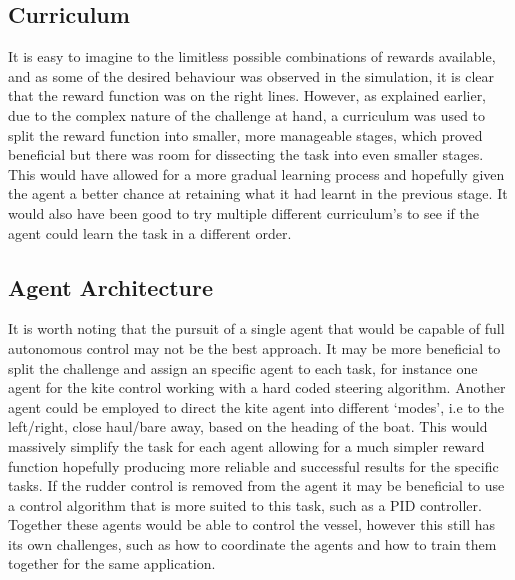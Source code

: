 \subsection*{Curriculum}

It is easy to imagine to the limitless possible combinations of rewards available, and as some of the desired behaviour was observed in the simulation, it is clear that the reward function was on the right lines. However, as explained earlier, due to the complex nature of the challenge at hand, a curriculum was used to split the reward function into smaller, more manageable stages, which proved beneficial but there was room for dissecting the task into even smaller stages. This would have allowed for a more gradual learning process and hopefully given the agent a better chance at retaining what it had learnt in the previous stage. It would also have been good to try multiple different curriculum's to see if the agent could learn the task in a different order.

\subsection*{Agent Architecture}
It is worth noting that the pursuit of a single agent that would be capable of full autonomous control may not be the best approach. It may be more beneficial to split the challenge and assign an specific agent to each task, for instance one agent for the kite control working with a hard coded steering algorithm. Another agent could be employed to direct the kite agent into different `modes', i.e to the left/right, close haul/bare away, based on the heading of the boat. This would massively simplify the task for each agent allowing for a much simpler reward function hopefully producing more reliable and successful results for the specific tasks. If the rudder control is removed from the agent it may be beneficial to use a control algorithm that is more suited to this task, such as a PID controller. Together these agents would be able to control the vessel, however this still has its own challenges, such as how to coordinate the agents and how to train them together for the same application. 



